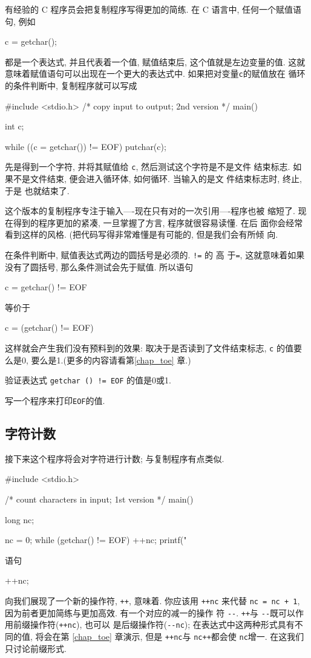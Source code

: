 有经验的 C 程序员会把复制程序写得更加的简练. 在 C 语言中, 任何一个赋值语句,
例如 
\begin{myverbatim}
    c = getchar();
\end{myverbatim}
都是一个表达式, 并且代表着一个值, 赋值结束后, 这个值就是左边变量的值. 这就
意味着赋值语句可以出现在一个更大的表达式中. 如果把对变量\verb"c"的赋值放在
\cwhile 循环的条件判断中, 复制程序就可以写成
\begin{myverbatim}
    #include <stdio.h>
    /* copy input to output; 2nd version */
    main()
    {
        int c;

        while ((c = getchar()) != EOF)
            putchar(c);
    }
\end{myverbatim}
\cwhile 先是得到一个字符, 并将其赋值给 \verb"c", 然后测试这个字符是不是文件
结束标志. 如果不是文件结束, \cwhile 便会进入循环体, 如何循环. 当输入的是文
件结束标志时, \cwhile 终止, 于是 \cmain 也就结束了.

这个版本的复制程序专注于输入----现在只有对\cgetchar 的一次引用----程序也被
缩短了. 现在得到的程序更加的紧凑, 一旦掌握了方言, 程序就很容易读懂. 在后
面你会经常看到这样的风格. (把代码写得非常难懂是有可能的, 但是我们会有所倾
向.

在条件判断中, 赋值表达式两边的圆括号是必须的. \verb"!=" 的 高
于\verb"=", 这就意味着如果没有了圆括号, 那么条件测试会先于赋值. 所以语句
\begin{myverbatim}
    c = getchar() != EOF
\end{myverbatim}
等价于
\begin{myverbatim}
    c = (getchar() != EOF)
\end{myverbatim}
这样就会产生我们没有预料到的效果: 取决于\cgetchar 是否读到了文件结束标志, 
\verb"c" 的值要么是0, 要么是1.(更多的内容请看第\ref{chap_toe} 章.)

\exercise 验证表达式 \verb"getchar () != EOF" 的值是0或1.

\exercise 写一个程序来打印\verb"EOF"的值.

\subsection{字符计数}
接下来这个程序将会对字符进行计数; 与复制程序有点类似.
\begin{myverbatim}
    #include <stdio.h>
    
    /* count characters in input; 1st version */
    main()
    {
        long    nc;

        nc = 0;
        while (getchar() != EOF)
            ++nc;
        printf("%
    }
\end{myverbatim}
语句 
\begin{myverbatim}
    ++nc;
\end{myverbatim}
向我们展现了一个新的操作符, \verb"++", 意味着. 你应该用 \verb"++nc"
来代替 \verb"nc = nc + 1", 因为前者更加简练与更加高效. 有一个对应的减一的操作
符 \verb"--". \verb"++"与 \verb"--"既可以作用前缀操作符(\verb"++nc"), 也可以
是后缀操作符(\verb"--nc"); 在表达式中这两种形式具有不同的值, 将会在第
\ref{chap_toe} 章演示,
但是 \verb"++nc"与 \verb"nc++"都会使 \verb"nc"增一. 在这我们只讨论前缀形式.

